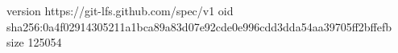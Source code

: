 version https://git-lfs.github.com/spec/v1
oid sha256:0a4f02914305211a1bca89a83d07e92cde0e996cdd3dda54aa39705ff2bffefb
size 125054
